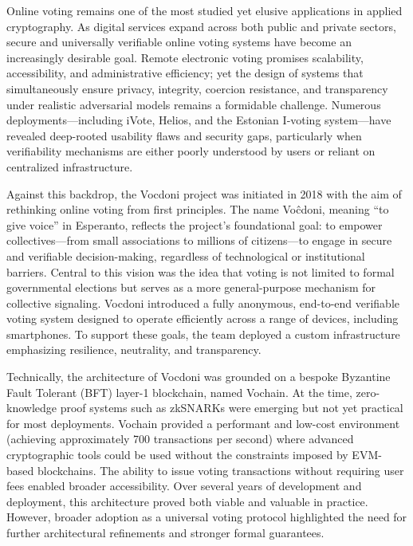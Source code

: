 
Online voting remains one of the most studied yet elusive applications in applied cryptography. As digital services expand across both public and private sectors, secure and universally verifiable online voting systems have become an increasingly desirable goal. Remote electronic voting promises scalability, accessibility, and administrative efficiency; yet the design of systems that simultaneously ensure privacy, integrity, coercion resistance, and transparency under realistic adversarial models remains a formidable challenge. Numerous deployments—including iVote, Helios, and the Estonian I‑voting system—have revealed deep-rooted usability flaws and security gaps, particularly when verifiability mechanisms are either poorly understood by users or reliant on centralized infrastructure.

Against this backdrop, the Vocdoni project was initiated in 2018 with the aim of rethinking online voting from first principles. The name Voĉdoni, meaning “to give voice” in Esperanto, reflects the project’s foundational goal: to empower collectives—from small associations to millions of citizens—to engage in secure and verifiable decision-making, regardless of technological or institutional barriers. Central to this vision was the idea that voting is not limited to formal governmental elections but serves as a more general-purpose mechanism for collective signaling. Vocdoni introduced a fully anonymous, end-to-end verifiable voting system designed to operate efficiently across a range of devices, including smartphones. To support these goals, the team deployed a custom infrastructure emphasizing resilience, neutrality, and transparency.

Technically, the architecture of Vocdoni was grounded on a bespoke Byzantine Fault Tolerant (BFT) layer-1 blockchain, named Vochain. At the time, zero-knowledge proof systems such as zkSNARKs were emerging but not yet practical for most deployments. Vochain provided a performant and low-cost environment (achieving approximately 700 transactions per second) where advanced cryptographic tools could be used without the constraints imposed by EVM-based blockchains. The ability to issue voting transactions without requiring user fees enabled broader accessibility. Over several years of development and deployment, this architecture proved both viable and valuable in practice. However, broader adoption as a universal voting protocol highlighted the need for further architectural refinements and stronger formal guarantees.

